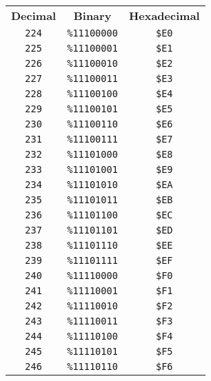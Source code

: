 \begin{multicols}{2}
\begin{center}
 \begin{tabular}{|c|c|c|}
  \hline
		\textbf{Decimal} & \textbf{Binary} & \textbf{Hexadecimal} \\ \hhline{|=|=|=|}   
	 \texttt{224} & \texttt{\%11100000} &  \texttt{\$E0} \\ \hline
 \texttt{225} & \texttt{\%11100001} &  \texttt{\$E1} \\ \hline
 \texttt{226} & \texttt{\%11100010} &  \texttt{\$E2} \\ \hline
 \texttt{227} & \texttt{\%11100011} &  \texttt{\$E3} \\ \hline
 \texttt{228} & \texttt{\%11100100} &  \texttt{\$E4} \\ \hline
 \texttt{229} & \texttt{\%11100101} &  \texttt{\$E5} \\ \hline
 \texttt{230} & \texttt{\%11100110} &  \texttt{\$E6} \\ \hline
 \texttt{231} & \texttt{\%11100111} &  \texttt{\$E7} \\ \hline
 \texttt{232} & \texttt{\%11101000} &  \texttt{\$E8} \\ \hline
 \texttt{233} & \texttt{\%11101001} &  \texttt{\$E9} \\ \hline
 \texttt{234} & \texttt{\%11101010} &  \texttt{\$EA} \\ \hline
 \texttt{235} & \texttt{\%11101011} &  \texttt{\$EB} \\ \hline
 \texttt{236} & \texttt{\%11101100} &  \texttt{\$EC} \\ \hline
 \texttt{237} & \texttt{\%11101101} &  \texttt{\$ED} \\ \hline
 \texttt{238} & \texttt{\%11101110} &  \texttt{\$EE} \\ \hline
 \texttt{239} & \texttt{\%11101111} &  \texttt{\$EF} \\ \hline
 \texttt{240} & \texttt{\%11110000} &  \texttt{\$F0} \\ \hline
 \texttt{241} & \texttt{\%11110001} &  \texttt{\$F1} \\ \hline
 \texttt{242} & \texttt{\%11110010} &  \texttt{\$F2} \\ \hline
 \texttt{243} & \texttt{\%11110011} &  \texttt{\$F3} \\ \hline
 \texttt{244} & \texttt{\%11110100} &  \texttt{\$F4} \\ \hline
 \texttt{245} & \texttt{\%11110101} &  \texttt{\$F5} \\ \hline
 \texttt{246} & \texttt{\%11110110} &  \texttt{\$F6} \\ \hline

\end{tabular}
\end{center}
\end{multicols}
